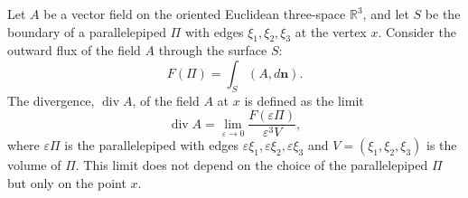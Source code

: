 Let $A$ be a vector field on the oriented Euclidean three-space $\mathbb{R}^3$, and let $S$ be the boundary of a parallelepiped $\Pi$ with edges $\xi_1, \xi_2, \xi_3$ at the vertex $x$. Consider the outward flux of the field $A$ through the surface $S$:
$$F(\Pi) = \int_S (A, d\mathbf{n}).$$
The divergence, $\operatorname{div} A$, of the field $A$ at $x$ is defined as the limit
$$\operatorname{div} A = \lim_{\varepsilon \to 0} \frac{F(\varepsilon \Pi)}{\varepsilon^3 V},$$
where $\varepsilon \Pi$ is the parallelepiped with edges $\varepsilon \xi_1, \varepsilon \xi_2, \varepsilon \xi_3$ and $V = (\xi_1, \xi_2, \xi_3)$ is the volume of $\Pi$. This limit does not depend on the choice of the parallelepiped $\Pi$ but only on the point $x$.
